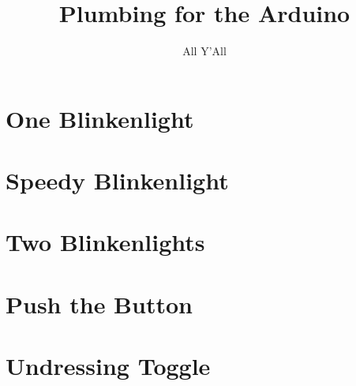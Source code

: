 \documentclass[a5paper]{scrbook}
\title{Plumbing for the Arduino}
\author{All Y'All}
\begin{document}
	
\maketitle
\tableofcontents

\chapter{One Blinkenlight\label{ch1}}


\chapter{Speedy Blinkenlight\label{ch2}}


\chapter{Two Blinkenlights\label{ch3}}


\chapter{Push the Button\label{ch4}}


\chapter{Undressing Toggle\label{ch5}}

\end{document}
